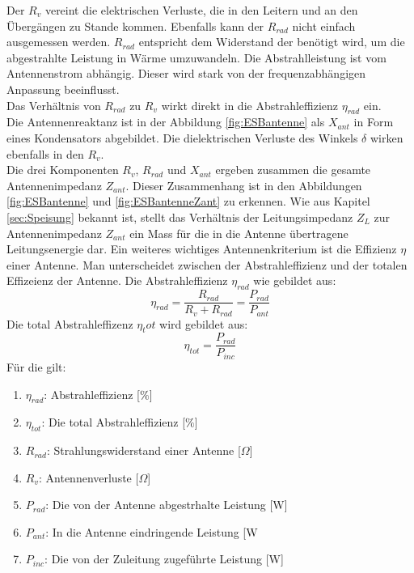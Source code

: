 \newpage
Der $R_{v}$ vereint die elektrischen Verluste, die in den Leitern und an den Übergängen zu Stande kommen. Ebenfalls kann der $R_{rad}$ nicht einfach ausgemessen werden. $R_{rad}$ entspricht dem Widerstand der benötigt wird, um  die abgestrahlte Leistung in Wärme umzuwandeln. Die Abstrahlleistung ist vom Antennenstrom abhängig. Dieser wird stark von der frequenzabhängigen Anpassung beeinflusst.\\
Das Verhältnis von $R_{rad}$  zu $R_{v}$ wirkt direkt in die Abstrahleffizienz $\eta_{rad}$ ein. \\
Die Antennenreaktanz ist in der Abbildung \ref{fig:ESBantenne} als $X_{ant}$ in Form eines Kondensators abgebildet. Die dielektrischen Verluste des Winkels $\delta$ wirken ebenfalls in den $R_{v}$.\\
Die drei Komponenten $R_{v}$, $R_{rad}$ und $X_{ant}$ ergeben zusammen die gesamte Antennenimpedanz $Z_{ant}$. Dieser Zusammenhang ist  in den Abbildungen \ref{fig:ESBantenne} und \ref{fig:ESBantenneZant} zu erkennen. Wie aus Kapitel \ref{sec:Speisung} bekannt ist, stellt das Verhältnis der Leitungsimpedanz $Z_L$ zur Antennenimpedanz $Z_{ant}$ ein Mass für die in die Antenne übertragene Leitungsenergie dar. Ein weiteres wichtiges Antennenkriterium ist die Effizienz $\eta$ einer Antenne.  Man unterscheidet zwischen der Abstrahleffizienz und der totalen Effizeienz der Antenne. Die Abstrahleffizienz $\eta_{rad}$ wie gebildet aus:
\begin{equation}
\eta_{rad}=\dfrac{R_{rad}}{R_v + R_{rad}}=\dfrac{P_{rad}}{P_{ant}}
\label{eq:eta_rad}
\end{equation}
Die total Abstrahleffizenz $\eta_tot$ wird gebildet aus:
\begin{equation}
\eta_{tot}=\dfrac{P_{rad}}{P_{inc}}
\label{eq:eta_tot}
\end{equation}
Für die gilt:
\begin{enumerate}[leftmargin=2cm]
   \item[] $\eta_{rad}$: Abstrahleffizienz [$\%$] 
   \item[] $\eta_{tot}$: Die total Abstrahleffizienz [$\%$] 
   \item[] $R_{rad}$: Strahlungswiderstand einer Antenne [$\Omega$]  
   \item[] $R_v$: Antennenverluste [$\Omega$] 
   \item[] $P_{rad}$: Die von der Antenne abgestrhalte Leistung  [W] 
   \item[] $P_{ant}$: In die Antenne eindringende Leistung  [W 
   \item[] $P_{inc}$: Die von der Zuleitung zugeführte Leistung  [W] 
\end{enumerate} 


